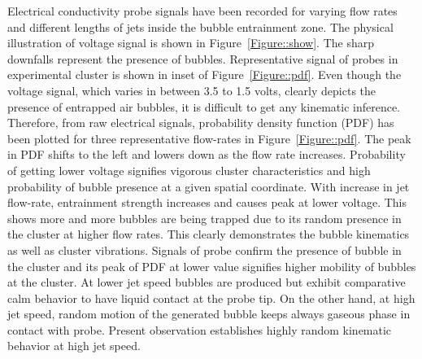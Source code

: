Electrical conductivity probe signals have been recorded for varying flow rates and different lengths of jets inside the bubble entrainment zone. The physical illustration of voltage signal is shown in Figure~\ref{Figure::show}. The sharp downfalls represent the presence of bubbles. Representative signal of probes in experimental cluster is shown in inset of Figure~\ref{Figure::pdf}. Even though the voltage signal, which varies in between 3.5 to 1.5 volts, clearly depicts the presence of entrapped air bubbles, it is difficult to get any kinematic inference. Therefore, from raw electrical signals, probability density function (PDF) has been plotted for three representative flow-rates in Figure~\ref{Figure::pdf}. The peak in PDF shifts to the left and lowers down as the flow rate increases. Probability of getting lower voltage signifies vigorous cluster characteristics and high probability of bubble presence at a given spatial coordinate. With increase in jet flow-rate, entrainment strength increases and causes peak at lower voltage. This shows more and more bubbles are being trapped due to its random presence in the cluster at higher flow rates. This clearly demonstrates the bubble kinematics as well as cluster vibrations. Signals of probe confirm the presence of bubble in the cluster and its peak of PDF at lower value signifies higher mobility of bubbles at the cluster. At lower jet speed bubbles are produced but exhibit comparative calm behavior to have liquid contact at the probe tip. On the other hand, at high jet speed, random motion of the generated bubble keeps always gaseous phase in contact with probe. Present observation establishes highly random kinematic behavior at high jet speed.
